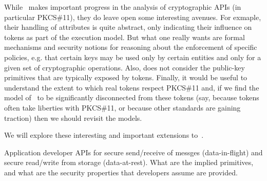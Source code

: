 While~\cite{SSW} makes important progress in the analysis of
cryptographic APIs (in particular PKCS\#11), they do leave open some
interesting avenues.  For exmaple, their handling of attributes is
quite abstract, only indicating their influence on tokens as part of
the execution model.  But what one really wants are formal mechanisms and
security notions for reasoning about the enforcement of specific
policies, e.g. that certain keys may be used only by certain entities
and only for a given set of cryptographic operations.  Also,
\cite{SSW} does not consider the public-key primitives that are
typically exposed by tokens.  Finally, it would be useful to
understand the extent to which real tokens respect PKCS\#11 and, if we
find the model of~\cite{SSW} to be significantly disconnected from
these tokens (say, because tokens often take liberties with PKCS\#11,
or because other standards are gaining traction) then we should
revisit the models.

\begin{task} We will explore these interesting and important
  extensions to~\cite{SSW}. 
\end{task}
%

\begin{task}
Application developer APIs for secure send/receive of messges
(data-in-flight) and secure read/write from storage (data-at-rest).  What are
the implied primitives, and what are the security properties that developers
assume are provided.
\end{task}

